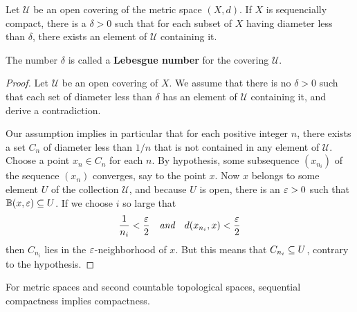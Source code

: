 \begin{lemma}
Let $\mathcal{U}$ be an open covering of the metric space $(X,d)$. If $X$ is sequencially compact, there is a $\delta>0$ such that for each subset of $X$ having diameter less than $\delta$, there exists an element of $\mathcal{U}$ containing it.\par
The number $\delta$ is called a \textbf{Lebesgue number} for the covering $\mathcal{U}$.
\end{lemma}
\begin{proof}
Let $\mathcal{U}$ be an open covering of $X$. We assume that there is no $\delta>0$
such that each set of diameter less than $\delta$ has an element of $\mathcal{U}$ containing it, and derive a contradiction.\par
Our assumption implies in particular that for each positive integer $n$, there exists a set $C_n$ of diameter less than $1/n$ that is not contained in any element of $\mathcal{U}$. Choose a point $x_n\in C_n$ for each $n$. By hypothesis, some subsequence $(x_{n_i})$ of the sequence $(x_n)$ converges, say to the point $x$. Now $x$ belongs to some element $U$ of the collection $\mathcal{U}$, and because $U$ is open, there is an $\varepsilon>0$ such that $\mathbb{B}(x,\varepsilon)\subseteq U$. If we choose $i$ so large that 
\[\frac{1}{n_i}<\frac{\varepsilon}{2}\quad\textit{and}\quad d(x_{n_i},x)<\frac{\varepsilon}{2}\] 
then $C_{n_i}$ lies in the $\varepsilon$-neighborhood of $x$. But this means that $C_{n_i}\subseteq U$, contrary to the hypothesis.
\end{proof}
\begin{proposition}
For metric spaces and second countable topological spaces, sequential compactness implies compactness.
\end{proposition}
